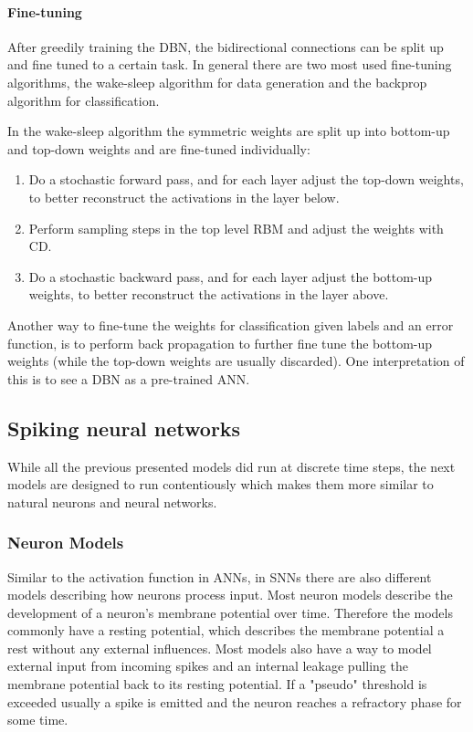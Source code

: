 \paragraph{Fine-tuning}

After greedily training the DBN, the bidirectional connections can be split up and fine tuned to a certain task.
In general there are two most used fine-tuning algorithms, the wake-sleep algorithm for data generation and the backprop algorithm for classification. 

In the wake-sleep algorithm the symmetric weights are split up into bottom-up and top-down weights and are fine-tuned individually:
\begin{enumerate}
\item Do a stochastic forward pass, and for each layer adjust the top-down weights, to better reconstruct the activations in the layer below.
\item Perform sampling steps in the top level RBM and adjust the weights with CD.
\item Do a stochastic backward pass, and for each layer adjust the bottom-up weights, to better reconstruct the activations in the layer above.
\end{enumerate}

Another way to fine-tune the weights for classification given labels and an error function, is to perform back propagation to further fine tune the bottom-up weights (while the top-down weights are usually discarded). 
One interpretation of this is to see a DBN as a pre-trained ANN.

\subsection{Spiking neural networks}

While all the previous presented models did run at discrete time steps, the next models are designed to run contentiously which makes them more similar to natural neurons and neural networks. 

\subsubsection{Neuron Models}

Similar to the activation function in ANNs, in SNNs there are also different models describing how neurons process input.
Most neuron models describe the development of a neuron's membrane potential over time.
Therefore the models commonly have a resting potential, which describes the membrane potential a rest without any external influences. 
Most models also have a way to model external input from incoming spikes and an internal leakage pulling the membrane potential back to its resting potential. 
If a "pseudo" threshold is exceeded usually a spike is emitted and the neuron reaches a refractory phase for some time.

